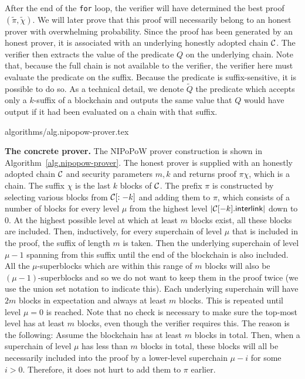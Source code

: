 After the end of the \texttt{for} loop, the verifier will have determined the
best proof $(\tilde\pi, \tilde\chi)$. We will later prove that this proof will
necessarily belong to an honest prover with overwhelming probability. Since the
proof has been generated by an honest prover, it is associated with an
underlying honestly adopted chain $\mathcal{C}$. The verifier then extracts the value
of the predicate $Q$ on the underlying chain. Note that, because the full chain
is not available to the verifier, the verifier here must evaluate the predicate
on the suffix. Because the predicate is suffix-sensitive, it is possible to do
so. As a technical detail, we denote $\tilde Q$ the predicate which accepts only
a $k$-suffix of a blockchain and outputs the same value that $Q$ would have
output if it had been evaluated on a chain with that suffix.

{algorithms/alg.nipopow-prover.tex}

\noindent
\textbf{The concrete prover.}
The NIPoPoW prover construction is shown in Algorithm~\ref{alg.nipopow-prover}.
The honest prover is supplied with an honestly adopted chain $\mathcal{C}$ and
security parameters $m, k$ and returns proof $\pi\chi$, which is a
chain. The suffix $\chi$ is the last $k$ blocks of $\mathcal{C}$. The prefix $\pi$ is
constructed by selecting various blocks from $\mathcal{C}[:-k]$ and adding them to
$\pi$, which consists of a number of blocks for every level $\mu$ from the
highest level $|\mathcal{C}[-k].\textsf{interlink}|$ down to $0$. At the highest
possible level at which at least $m$ blocks exist, all these blocks are
included. Then, inductively, for every superchain of level $\mu$ that is
included in the proof, the suffix of length $m$ is taken. Then the underlying
superchain of level $\mu - 1$ spanning from this suffix until the end of the
blockchain is also included. All the $\mu$-superblocks which are within this
range of $m$ blocks will also be $(\mu-1)$-superblocks and so we do not want to
keep them in the proof twice (we use the union set notation to indicate this).
Each underlying superchain will have $2m$ blocks in expectation and always at
least $m$ blocks. This is repeated until level $\mu = 0$ is reached. Note that
no check is necessary to make sure the top-most level has at least $m$ blocks,
even though the verifier requires this. The reason is the following: Assume the
blockchain has at least $m$ blocks in total. Then, when a superchain of level
$\mu$ has less than $m$ blocks in total, these blocks will all be necessarily
included into the proof by a lower-level superchain $\mu - i$ for some $i > 0$.
Therefore, it does not hurt to add them to $\pi$ earlier.

